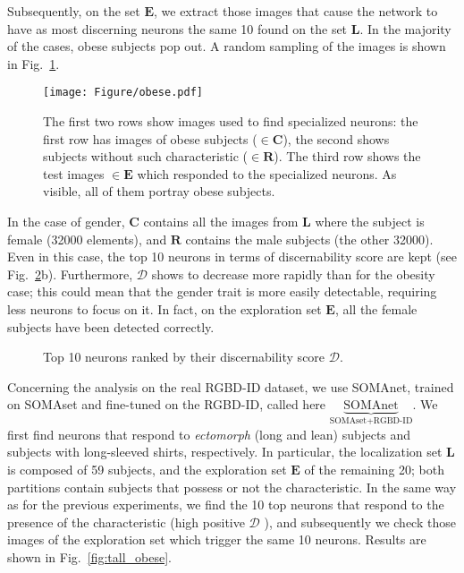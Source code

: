 \documentclass[10pt,journal,letterpaper,compsoc]{IEEEtran}
\newcommand{\ts}[2]{$\underbrace{\text{#1}}_\text{#2}$}
\begin{document}
Subsequently, on the set $\mathbf{E}$, we extract those images that cause the network to have as most discerning neurons the same 10 found on the set $\mathbf{L}$. In the majority of the cases, obese subjects pop out. A random sampling of the images is shown in Fig.~\ref{fig:obese_soma}.


\begin{figure}[!htb]
  \centering
  \texttt{[image: Figure/obese.pdf]}
  \caption{ The first two rows show images used to find specialized neurons: the first row has images of obese subjects ($\in \mathbf{C}$), the second shows subjects without such characteristic ($\in \mathbf{R}$). The third row shows the test images $\in \mathbf{E}$ which responded to the specialized neurons. As visible, all of them portray obese subjects.}
  \label{fig:obese_soma}
\end{figure}



In the case of gender, $\mathbf{C}$ contains all the images from $\mathbf{L}$ where the subject is female (32000 elements), and  $\mathbf{R}$ contains the male subjects (the other 32000). Even in this case, the top 10 neurons in terms of discernability score are kept (see Fig.~\ref{fig:Female_and_obese}b). Furthermore, $\mathcal{D}$ shows to decrease more rapidly than for the obesity case; this could mean that the gender trait is more easily detectable, requiring less neurons to focus on it. In fact, on the exploration set $\mathbf{E}$, all the female subjects have been detected correctly.



\begin{figure}[!htb]
  \centering
  \hfill
  \caption{Top 10 neurons ranked by their discernability score $\mathcal{D}$.
  }
  \label{fig:Female_and_obese}
\end{figure}




Concerning the analysis on the real RGBD-ID dataset, we use SOMAnet, trained on SOMAset and fine-tuned on the RGBD-ID, called here \ts{SOMAnet}{SOMAset+RGBD-ID}. We first find neurons that respond to \emph{ectomorph} (long and lean) subjects and subjects with long-sleeved shirts, respectively.
In particular, the localization set $\mathbf{L}$ is composed of 59 subjects,  and the exploration set $\mathbf{E}$ of the remaining 20; both partitions contain subjects that possess or not the characteristic. In the same way as for the previous experiments, we find the 10 top neurons that respond to the presence of the characteristic (high positive $\mathcal{D}$ ), and subsequently we check those images of the exploration set which trigger the same 10 neurons. Results are shown in Fig.~\ref{fig:tall_obese}.
\end{document}
